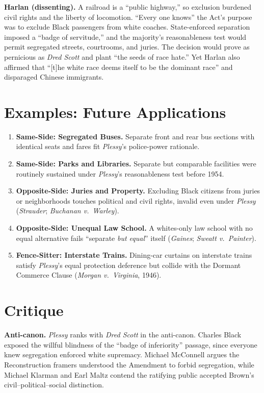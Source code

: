 \documentclass[12pt]{article}
\begin{document}
\textbf{Harlan (dissenting).} A railroad is a ``public highway,'' so exclusion burdened civil rights and the liberty of locomotion. ``Every one knows'' the Act's purpose was to exclude Black passengers from white coaches. State-enforced separation imposed a ``badge of servitude,'' and the majority's reasonableness test would permit segregated streets, courtrooms, and juries. The decision would prove as pernicious as \textit{Dred Scott} and plant ``the seeds of race hate.'' Yet Harlan also affirmed that ``[t]he white race deems itself to be the dominant race'' and disparaged Chinese immigrants.

\section{Examples: Future Applications}

\begin{enumerate}
\item \textbf{Same-Side: Segregated Buses.} Separate front and rear bus sections with identical seats and fares fit \textit{Plessy}'s police-power rationale.
\item \textbf{Same-Side: Parks and Libraries.} Separate but comparable facilities were routinely sustained under \textit{Plessy}'s reasonableness test before 1954.
\item \textbf{Opposite-Side: Juries and Property.} Excluding Black citizens from juries or neighborhoods touches political and civil rights, invalid even under \textit{Plessy} (\textit{Strauder}; \textit{Buchanan v.\ Warley}).
\item \textbf{Opposite-Side: Unequal Law School.} A whites-only law school with no equal alternative fails ``separate \textit{but equal}'' itself (\textit{Gaines}; \textit{Sweatt v.\ Painter}).
\item \textbf{Fence-Sitter: Interstate Trains.} Dining-car curtains on interstate trains satisfy \textit{Plessy}'s equal protection deference but collide with the Dormant Commerce Clause (\textit{Morgan v.\ Virginia}, 1946).
\end{enumerate}

\section{Critique}

\textbf{Anti-canon.} \textit{Plessy} ranks with \textit{Dred Scott} in the anti-canon. Charles Black exposed the willful blindness of the ``badge of inferiority'' passage, since everyone knew segregation enforced white supremacy. Michael McConnell argues the Reconstruction framers understood the Amendment to forbid segregation, while Michael Klarman and Earl Maltz contend the ratifying public accepted Brown's civil--political--social distinction.
\end{document}
